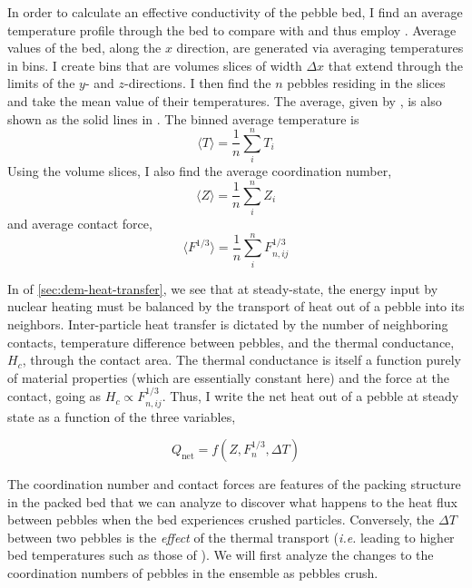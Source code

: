 In order to calculate an effective conductivity of the pebble bed, I find an average temperature profile through the bed to compare with  and thus employ . Average values of the bed, along the $x$ direction, are generated via averaging temperatures in bins. I create bins that are volumes slices of width $\Delta x$ that extend through the limits of the $y$- and $z$-directions. I then find the $n$ pebbles residing in the slices and take the mean value of their temperatures. The average, given by , is also shown as the solid lines in . The binned average temperature is 
\begin{equation}\label{eq:binned-T}
    \langle T\rangle = \frac{1}{n}\sum_{i}^n T_i    
\end{equation}
Using the volume slices, I also find the average coordination number, 
\begin{equation}\label{eq:binned-z}
    \langle Z \rangle = \frac{1}{n}\sum_{i}^n Z_i
\end{equation}
and average contact force, 
\begin{equation}\label{eq:binned-f}
    \langle F^{1/3} \rangle = \frac{1}{n}\sum_{i}^n F_{n,ij}^{1/3}
\end{equation}


In  of \cref{sec:dem-heat-transfer}, we see that at steady-state, the energy input by nuclear heating must be balanced by the transport of heat out of a pebble into its neighbors. Inter-particle heat transfer is dictated by the number of neighboring contacts, temperature difference between pebbles, and the thermal conductance, $H_{c}$, through the contact area. The thermal conductance is itself a function purely of material properties  (which are essentially constant here) and the force at the contact, going as $H_{c} \propto F_{n,ij}^{1/3}$. Thus, I write the net heat out of a pebble at steady state as a function of the three variables,

\begin{equation}
    Q_\text{net} =f( Z, F_n^{1/3}, \Delta T)
\end{equation}

The coordination number and contact forces are features of the packing structure in the packed bed that we can analyze to discover what happens to the heat flux between pebbles when the bed experiences crushed particles. Conversely, the $\Delta T$ between two pebbles is the \textit{effect} of the thermal transport (\textit{i.e.} leading to higher bed temperatures such as those of ). We will first analyze the changes to the coordination numbers of pebbles in the ensemble as pebbles crush.



